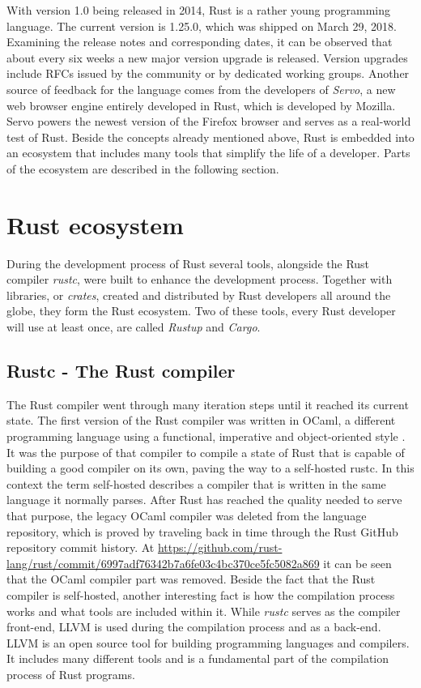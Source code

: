 With version 1.0 being released in 2014, Rust is a rather young programming language. The current version is 1.25.0, which was shipped on March 29, 2018. Examining the release notes and corresponding dates, it can be observed that about every six weeks a new major version upgrade is released. Version upgrades include \acp{RFC} issued by the community or by dedicated working groups. Another source of feedback for the language comes from the developers of \textit{Servo}, a new web browser engine entirely developed in Rust, which is developed by Mozilla. Servo powers the newest version of the Firefox browser and serves as a real-world test of Rust. Beside the concepts already mentioned above, Rust is embedded into an ecosystem that includes many tools that simplify the life of a developer. Parts of the ecosystem are described in the following section.

\section{Rust ecosystem}

During the development process of Rust several tools, alongside the Rust compiler \textit{rustc}, were built to enhance the development process. Together with libraries, or \textit{crates}, created and distributed by Rust developers all around the globe, they form the Rust ecosystem. Two of these tools, every Rust developer will use at least once, are called \textit{Rustup} and \textit{Cargo}. 

\subsection{Rustc - The Rust compiler}

The Rust compiler went through many iteration steps until it reached its current state. The first version of the Rust compiler was written in OCaml, a different programming language using a functional, imperative and object-oriented style \cite{OCAML}. It was the purpose of that compiler to compile a state of Rust that is capable of building a good compiler on its own, paving the way to a self-hosted rustc. In this context the term self-hosted describes a compiler that is written in the same language it normally parses. After Rust has reached the quality needed to serve that purpose, the legacy OCaml compiler was deleted from the language repository, which is proved by traveling back in time through the Rust GitHub repository commit history. At \url{https://github.com/rust-lang/rust/commit/6997adf76342b7a6fe03c4bc370ce5fc5082a869} it can be seen that the OCaml compiler part was removed. Beside the fact that the Rust compiler is self-hosted, another interesting fact is how the compilation process works and what tools are included within it. While \textit{rustc} serves as the compiler front-end, \ac{LLVM} is used during the compilation process and as a back-end. \ac{LLVM} is an open source tool for building programming languages and compilers. It includes many different tools and is a fundamental part of the compilation process of Rust programs.

